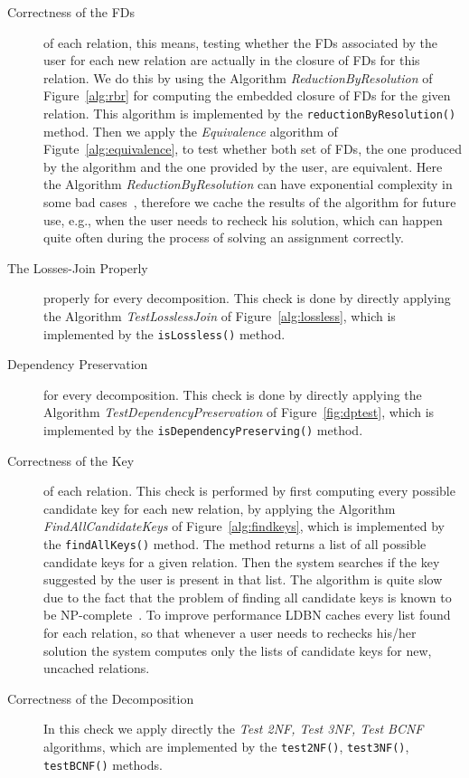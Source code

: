 \begin{description}
  \item [Correctness of the FDs] of each relation, this means, testing whether the FDs associated by the user
    for each new relation are actually in the closure of FDs for this relation. We do this by
    using the Algorithm \textit{ReductionByResolution} of Figure~\ref{alg:rbr} for computing the embedded closure of FDs for the given
    relation. This algorithm is implemented by the \verb=reductionByResolution()= method. Then we apply
    the \textit{Equivalence} algorithm of Figute~\ref{alg:equivalence}, to test 
    whether both set of FDs, the one produced by 
    the algorithm and the one provided by the user, are equivalent. Here the Algorithm \textit{ReductionByResolution}
    can have exponential complexity in some bad cases~\cite{p4}, therefore we cache the results
    of the algorithm for future use, e.g., when the user needs to recheck his solution, which can happen
    quite often during the process of solving an assignment correctly. 

	\item [The Losses-Join Properly] properly for every decomposition. This check is done by directly applying the 
		Algorithm \textit{TestLosslessJoin} of Figure~\ref{alg:lossless}, which is 
		implemented by the \verb=isLossless()= method.
		
	\item [Dependency Preservation] for every decomposition. This check is done by directly applying the 
		Algorithm \textit{TestDependencyPreservation} of Figure~\ref{fig:dptest}, which is implemented by the 
		\verb=isDependencyPreserving()= method.
		
	\item [Correctness of the Key] of each relation. This check is performed by first computing 
		every possible candidate key 
		for each new relation, by applying the Algorithm \textit{FindAllCandidateKeys} of Figure~\ref{alg:findkeys}, 
		which is implemented
		by the \verb=findAllKeys()= method. The method returns a list of all possible candidate keys
		for a given relation. Then the system searches if the key suggested by the user is 
		present in that list. The algorithm is quite slow due to the fact that the problem of
		finding all candidate keys is known to be NP-complete~\cite{p3}. To improve performance LDBN
		caches every list found for each relation, so that whenever a user needs to rechecks his/her solution
		the system computes only the lists of candidate keys for new, uncached relations.  
		
	\item [Correctness of the Decomposition] In this check we apply directly the 
		\textit{Test 2NF, Test 3NF, Test BCNF} algorithms, which are implemented by the 
		\verb=test2NF()=, \verb=test3NF()=, \verb=testBCNF()= methods.
\end{description}

